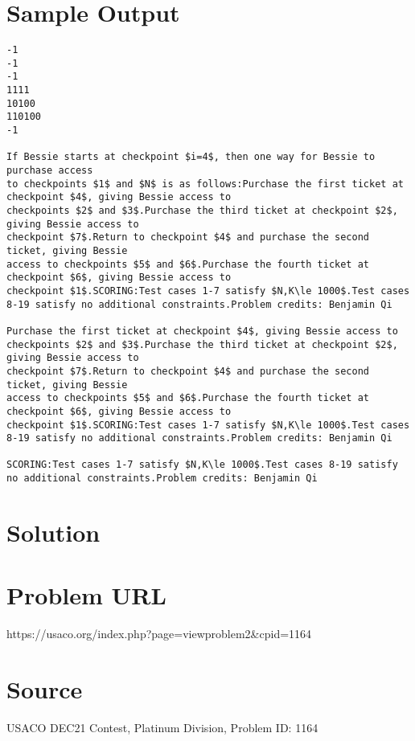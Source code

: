 \documentclass[12pt]{article}
\begin{document}
\section*{Sample Output}
\begin{verbatim}
-1
-1
-1
1111
10100
110100
-1

If Bessie starts at checkpoint $i=4$, then one way for Bessie to purchase access
to checkpoints $1$ and $N$ is as follows:Purchase the first ticket at checkpoint $4$, giving Bessie access to
checkpoints $2$ and $3$.Purchase the third ticket at checkpoint $2$, giving Bessie access to
checkpoint $7$.Return to checkpoint $4$ and purchase the second ticket, giving Bessie
access to checkpoints $5$ and $6$.Purchase the fourth ticket at checkpoint $6$, giving Bessie access to
checkpoint $1$.SCORING:Test cases 1-7 satisfy $N,K\le 1000$.Test cases 8-19 satisfy no additional constraints.Problem credits: Benjamin Qi

Purchase the first ticket at checkpoint $4$, giving Bessie access to
checkpoints $2$ and $3$.Purchase the third ticket at checkpoint $2$, giving Bessie access to
checkpoint $7$.Return to checkpoint $4$ and purchase the second ticket, giving Bessie
access to checkpoints $5$ and $6$.Purchase the fourth ticket at checkpoint $6$, giving Bessie access to
checkpoint $1$.SCORING:Test cases 1-7 satisfy $N,K\le 1000$.Test cases 8-19 satisfy no additional constraints.Problem credits: Benjamin Qi

SCORING:Test cases 1-7 satisfy $N,K\le 1000$.Test cases 8-19 satisfy no additional constraints.Problem credits: Benjamin Qi
\end{verbatim}

\section*{Solution}


\section*{Problem URL}
https://usaco.org/index.php?page=viewproblem2&cpid=1164

\section*{Source}
USACO DEC21 Contest, Platinum Division, Problem ID: 1164
\end{document}
